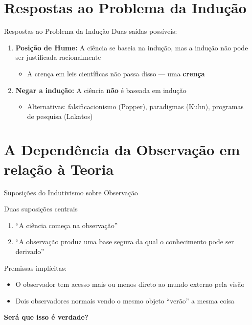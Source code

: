 \documentclass[aspectratio=169]{beamer}
\newcommand{\impt}[1]{\textcolor{maccent}{\textbf{#1}}}
\begin{document}
\section{Respostas ao Problema da Indução}

\begin{frame}{Respostas ao Problema da Indução}
  Duas saídas possíveis:

  \vspace{0.4cm}
  \begin{enumerate}
    \item \textbf{Posição de Hume:} A ciência se baseia na indução, mas a indução não pode ser justificada racionalmente
    \begin{itemize}
      \item A crença em leis científicas não passa disso --- uma \impt{crença}
    \end{itemize}

    \vspace{0.3cm}
    \pause
    \item \textbf{Negar a indução:} A ciência \impt{não} é baseada em indução
    \begin{itemize}
      \item Alternativas: falsificacionismo (Popper), paradigmas (Kuhn), programas de pesquisa (Lakatos)
    \end{itemize}
  \end{enumerate}
\end{frame}

\section{A Dependência da Observação em relação à Teoria}

\begin{frame}{Suposições do Indutivismo sobre Observação}
  \begin{block}{Duas suposições centrais}
    \begin{enumerate}
      \item ``A ciência começa na observação''
      \item ``A observação produz uma base segura da qual o conhecimento pode ser derivado''
    \end{enumerate}
  \end{block}

  \vspace{0.3cm}
  \pause
  Premissas implícitas:
  \begin{itemize}
    \item O observador tem acesso mais ou menos direto ao mundo externo pela visão
    \item Dois observadores normais vendo o mesmo objeto ``verão'' a mesma coisa
  \end{itemize}

  \vspace{0.3cm}
  \pause
  \impt{Será que isso é verdade?}
\end{frame}
\end{document}
